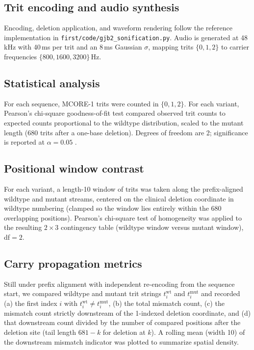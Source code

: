 \documentclass[preprint,12pt]{elsarticle}
\begin{document}
\subsection{Trit encoding and audio synthesis}

Encoding, deletion application, and waveform rendering follow the reference implementation in \texttt{first/code/gjb2\_sonification.py}. Audio is generated at 48\,kHz with 40\,ms per trit and an 8\,ms Gaussian $\sigma$, mapping trits $\{0,1,2\}$ to carrier frequencies $\{800,1600,3200\}$\,Hz.

\subsection{Statistical analysis}

For each sequence, MCORE-1 trits were counted in $\{0,1,2\}$. For each variant, Pearson's chi-square goodness-of-fit test compared observed trit counts to expected counts proportional to the wildtype distribution, scaled to the mutant length (680 trits after a one-base deletion). Degrees of freedom are 2; significance is reported at $\alpha=0.05$ \citep{agresti2002categorical}.

\subsection{Positional window contrast}

For each variant, a length-10 window of trits was taken along the prefix-aligned wildtype and mutant streams, centered on the clinical deletion coordinate in wildtype numbering (clamped so the window lies entirely within the 680 overlapping positions). Pearson's chi-square test of homogeneity was applied to the resulting $2\times 3$ contingency table (wildtype window versus mutant window), df$=2$.

\subsection{Carry propagation metrics}

Still under prefix alignment with independent re-encoding from the sequence start, we compared wildtype and mutant trit strings $t^{\mathrm{wt}}_i$ and $t^{\mathrm{mut}}_i$ and recorded (a) the first index $i$ with $t^{\mathrm{wt}}_i\neq t^{\mathrm{mut}}_i$, (b) the total mismatch count, (c) the mismatch count strictly downstream of the 1-indexed deletion coordinate, and (d) that downstream count divided by the number of compared positions after the deletion site (tail length $681-k$ for deletion at $k$). A rolling mean (width 10) of the downstream mismatch indicator was plotted to summarize spatial density.
\end{document}
